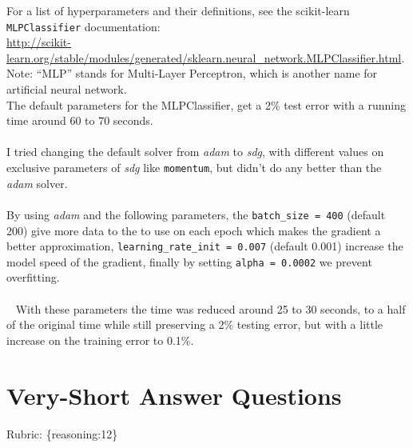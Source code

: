 \documentclass{article}
\def\rubric#1{\gre{Rubric: \{#1\}}}{}
\def\gre#1{{\color{gre}#1}}
\def\ans#1{{\color{ans}#1}}
\begin{document}
For a list of hyperparameters and their definitions, see the scikit-learn \texttt{MLPClassifier} documentation:\\
\url{http://scikit-learn.org/stable/modules/generated/sklearn.neural_network.MLPClassifier.html}. Note: ``MLP'' stands for Multi-Layer Perceptron,
which is another name for artificial neural network. \\
\ans{
    The default parameters for the MLPClassifier, get a 2\% test error with a running time around 60 to 70 seconds.\\ \\
    I tried changing the default solver from \emph{adam} to \emph{sdg}, with different values on exclusive
    parameters of \emph{sdg} like \texttt{momentum}, but didn't do any better than the \emph{adam} solver. \\ \\
    By using \emph{adam} and the following parameters, the \texttt{batch\_size = 400} (default 200) 
    give more data to the to use on each epoch which makes the gradient a better approximation, 
    \texttt{learning\_rate\_init = 0.007} (default 0.001) increase the model speed of the gradient,
    finally by setting \texttt{alpha = 0.0002} we prevent overfitting. \\ \\ 
    With these parameters the time was reduced around 25 to 30 seconds, to a half of 
    the original time while still preserving a 2\% testing error, but with a little increase on the 
    training error to 0.1\%.
}

\section{Very-Short Answer Questions}
\rubric{reasoning:12}
\end{document}
